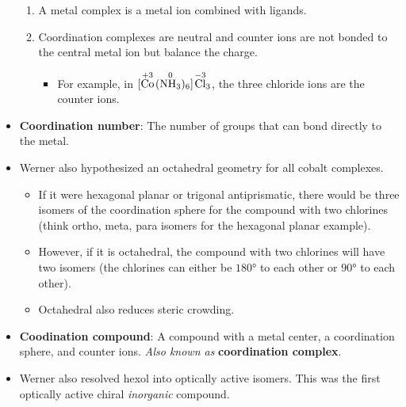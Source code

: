 \documentclass[../notes.tex]{subfiles}
\begin{document}
\begin{itemize}
\begin{enumerate}
        \item A metal complex is a metal ion combined with ligands.
        \item Coordination complexes are neutral and counter ions are not bonded to the central metal ion but balance the charge.
        \begin{itemize}
            \item For example, in $[\stackrel{+3}{\ce{Co}}\!(\stackrel{0}{\ce{NH3}})_6]\!\stackrel{-3}{\ce{Cl}}_3$, the three chloride ions are the counter ions.
        \end{itemize}
    \end{enumerate}
    \item \textbf{Coordination number}: The number of groups that can bond directly to the metal.
    \item Werner also hypothesized an octahedral geometry for all cobalt complexes.
    \begin{itemize}
        \item If it were hexagonal planar or trigonal antiprismatic, there would be three isomers of the coordination sphere for the compound with two chlorines (think ortho, meta, para isomers for the hexagonal planar example).
        \item However, if it is octahedral, the compound with two chlorines will have two isomers (the chlorines can either be $\ang{180}$ to each other or $\ang{90}$ to each other).
        \item Octahedral also reduces steric crowding.
    \end{itemize}
    \item \textbf{Coodination compound}: A compound with a metal center, a coordination sphere, and counter ions. \emph{Also known as} \textbf{coordination complex}.
    \item Werner also resolved hexol into optically active isomers. This was the first optically active chiral \emph{inorganic} compound.
\end{itemize}
\end{document}
